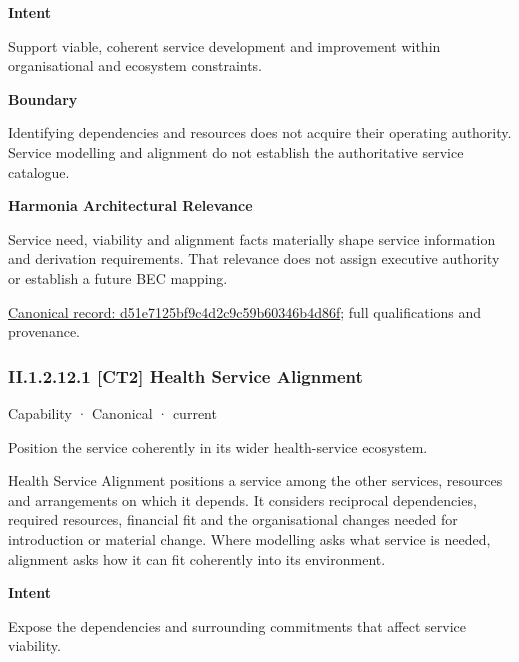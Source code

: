 \textbf{Intent}



Support viable, coherent service development and improvement within organisational and ecosystem constraints.



\textbf{Boundary}



Identifying dependencies and resources does not acquire their operating authority. Service modelling and alignment do not establish the authoritative service catalogue.



\textbf{Harmonia Architectural Relevance}



Service need, viability and alignment facts materially shape service information and derivation requirements. That relevance does not assign executive authority or establish a future BEC mapping.


{\footnotesize \href{../../../../continuum/strategy/capability/d51e7125bf9c4d2c9c59b60346b4d86f.md}{Canonical record: d51e7125bf9c4d2c9c59b60346b4d86f}; full qualifications and provenance.}\par
\subsubsection*{II.1.2.12.1 [CT2] Health Service Alignment}
\label{navigation:II.1.2.12.1}

\label{element:d4fc5367352741a99bd334f7e8bf5856}
{\small Capability · Canonical · current}\par

Position the service coherently in its wider health-service ecosystem.



Health Service Alignment positions a service among the other services, resources and arrangements on which it depends. It considers reciprocal dependencies, required resources, financial fit and the organisational changes needed for introduction or material change. Where modelling asks what service is needed, alignment asks how it can fit coherently into its environment.



\textbf{Intent}



Expose the dependencies and surrounding commitments that affect service viability.




